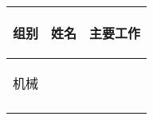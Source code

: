 
\begin{longtable}{ p{2cm} | p{3.5cm} | p{9.3cm} |}

    \hline

    \endfoot
    
    \rowcolor{tabhdcolor}

        \begin{center}
            组别
        \end{center} &
        \begin{center}
            姓名
        \end{center} &
        \begin{center}
            主要工作
        \end{center} \\

    \hline

    \endhead

        \begin{center}
            机械
        \end{center} &
        \begin{center}
            
        \end{center} &
        \begin{center}
            
        \end{center}  \\
        
    \hline
        \begin{center}
            
        \end{center}&
        \begin{center}
            
        \end{center}&
        \begin{center}
            

\end{center}
\end{longtable}
